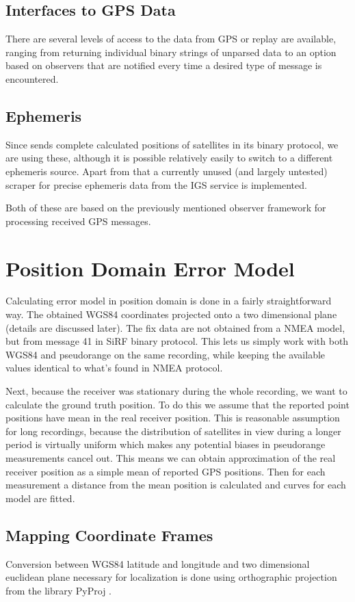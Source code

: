 \subsection{Interfaces to GPS Data}
There are several levels of access to the data from GPS or replay are available,
ranging from returning individual binary strings of unparsed data to an option based
on observers that are notified every time a desired type of message is encountered.

\subsection{Ephemeris}
Since \sirf sends complete calculated positions of satellites in its binary
protocol, we are using these, although it is possible relatively easily to switch
to a different ephemeris source.
Apart from that a currently unused (and largely untested) scraper for precise
ephemeris data from the IGS service \cite{orbit-data} is implemented.

Both of these are based on the previously mentioned observer framework for processing
received GPS messages.

\section{Position Domain Error Model}
Calculating error model in position domain is done in a fairly straightforward way.
The obtained WGS84 coordinates projected onto a two dimensional plane
(details are discussed later).
The fix data are not obtained from a NMEA model, but from message 41 in SiRF
binary protocol.
This lets us simply work with both WGS84 and pseudorange on the same recording,
while keeping the available values identical to what's found in NMEA protocol.

Next, because the receiver was stationary during the whole recording, we want to
calculate the ground truth position.
To do this we assume that the reported point positions have mean in the real receiver position.
This is reasonable assumption for long recordings,
because the distribution of satellites in view during a longer period is
virtually uniform which makes any potential biases in pseudorange measurements
cancel out.
This means we can obtain approximation of the real receiver position as a simple
mean of reported GPS positions.
Then for each measurement a distance from the mean position is calculated and
curves for each model are fitted.

\subsection{Mapping Coordinate Frames}
\label{sec:impl-coordinates}
Conversion between WGS84 latitude and longitude and two dimensional euclidean
plane necessary for localization is done using orthographic projection from
the library PyProj \cite{www-pyproj}.

